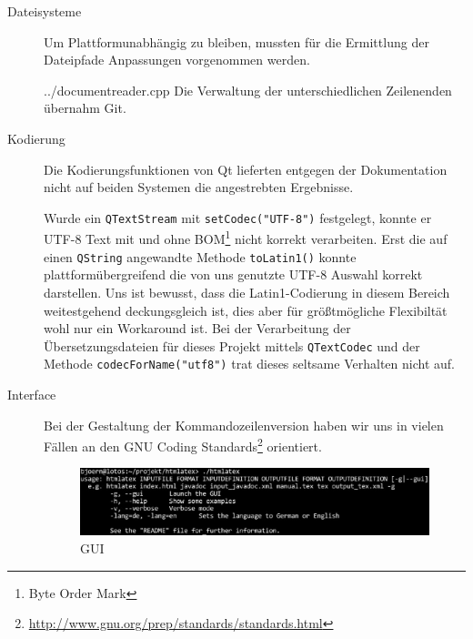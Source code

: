 \documentclass[	a4paper,		%
		titlepage, 		%
		fontsize=12pt		%
		]{scrartcl} 		%
\begin{document}
\begin{description}
 \item[Dateisysteme] Um Plattformunabhängig zu bleiben, mussten für die Ermittlung der Dateipfade Anpassungen vorgenommen werden.

	{../documentreader.cpp}
 Die Verwaltung der unterschiedlichen Zeilenenden übernahm Git.

 \item[Kodierung] Die Kodierungsfunktionen von Qt lieferten entgegen der Dokumentation nicht auf beiden Systemen die angestrebten Ergebnisse.

 Wurde ein \texttt{QTextStream} mit \texttt{setCodec("UTF-8")} festgelegt, konnte er UTF-8 Text mit und ohne BOM\footnote{Byte Order Mark} nicht korrekt verarbeiten. Erst die auf einen \texttt{QString} angewandte Methode \texttt{toLatin1()} konnte plattformübergreifend die von uns genutzte UTF-8 Auswahl korrekt darstellen. Uns ist bewusst, dass die Latin1-Codierung in diesem Bereich weitestgehend deckungsgleich ist, dies aber für größtmögliche Flexibiltät wohl nur ein Workaround ist. Bei der Verarbeitung der Übersetzungsdateien für dieses Projekt mittels \texttt{QTextCodec} und der Methode \texttt{codecForName("utf8")} trat dieses seltsame Verhalten nicht auf.

 \item[Interface]
 Bei der Gestaltung der Kommandozeilenversion haben wir uns in vielen Fällen an den GNU Coding Standards\footnote{\href{http://www.gnu.org/prep/standards/standards.html}{http://www.gnu.org/prep/standards/standards.html}} orientiert.
 \begin{figure} [H]
    \centering
	\includegraphics[width=\textwidth, keepaspectratio]{./img/console_usage.eps}
    \caption{GUI}
\end{figure}


\end{description}
\end{document}
